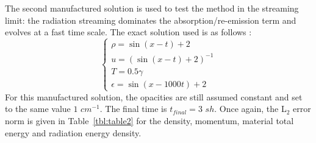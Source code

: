 \documentclass[review]{elsarticle}
\newcommand{\tbl}[1]{Table~\ref{#1}}                     %
\begin{document}
The second manufactured solution is used to test the method in the streaming limit: the radiation streaming dominates the absorption/re-emission term and evolves at a fast time scale. The exact solution used is as follows :
\begin{equation}
\label{eq:equation14}
\left\{
\begin{array}{llll}
\rho = \sin(x-t)+2 \\
u = \left( \sin(x-t)+2 \right)^{-1} \\
T = 0.5 \gamma \\
\epsilon = \sin(x-1000 t)+2
\end{array}
\right.
\end{equation}
For this manufactured solution, the opacities are still assumed constant and set to the same value $1$ $cm^{-1}$. The final time is $t_{final}=3$ $sh$. Once again, the L$_2$ error norm is given in \tbl{tbl:table2} for the density, momentum, material total energy and radiation energy density.
\end{document}
